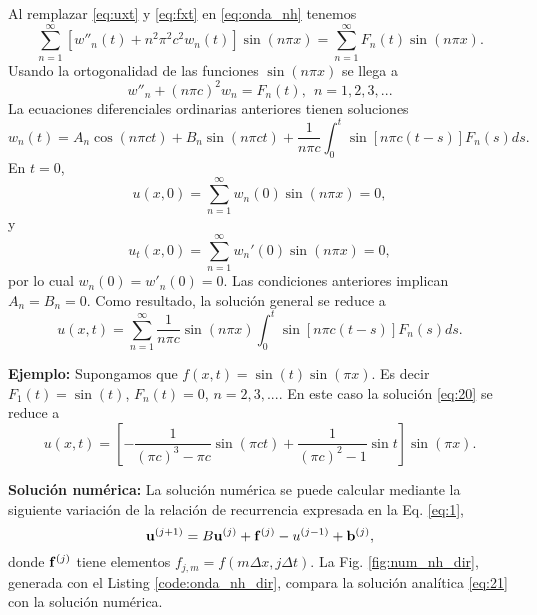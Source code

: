 \documentclass[11pt]{article}
\begin{document}
Al remplazar \eqref{eq:uxt} y \eqref{eq:fxt} en \eqref{eq:onda_nh} tenemos
\begin{equation}
  \label{eq:14}
  \sum_{n=1}^\infty \left[w''_n(t) + n^2\pi^2c^2 w_n(t)\right]\sin(n\pi x) = \sum_{n=1}^\infty F_n(t)\sin(n\pi x).
\end{equation}
Usando la ortogonalidad de las funciones $\sin(n\pi x)$ se llega a
\begin{equation}
  \label{eq:15}
  w''_n + (n\pi c)^2 w_n = F_n(t),~~n=1,2,3,...
\end{equation}
La ecuaciones diferenciales ordinarias anteriores tienen soluciones 
\begin{equation}
  \label{eq:17}
  w_n(t) = A_n \cos(n\pi ct) + B_n \sin(n\pi ct) + \frac{1}{n\pi c}\int_0^t \sin[n\pi c(t-s)]F_n(s)ds.
\end{equation}
En $t=0$,
\begin{equation}
  \label{eq:18}
  u(x,0) = \sum_{n=1}^\infty w_n(0)\sin(n\pi x) = 0,
\end{equation}
y
\begin{equation}
  \label{eq:18}
  u_t(x,0) = \sum_{n=1}^\infty w_n'(0)\sin(n\pi x) = 0,
\end{equation}
por lo cual $w_n(0) = w'_n(0)=0$. Las condiciones anteriores implican $A_n = B_n = 0$. Como resultado, la soluci\'on general se reduce a
\begin{equation}
  \label{eq:20}
  u(x,t) = \sum_{n=1}^\infty \frac{1}{n\pi c} \sin(n\pi x) \int_0^t \sin[n\pi c(t-s)]F_n(s)ds.
\end{equation}

{\bf Ejemplo:} Supongamos que $f(x,t) = \sin(t)\sin(\pi x)$. Es decir $F_1(t) = \sin(t)$, $F_n(t) = 0$, $n=2,3,...$. En este caso la soluci\'on \eqref{eq:20} se reduce a 
\begin{equation}
  \label{eq:21}
  u(x,t) = \left[-\frac{1}{(\pi c)^3 - \pi c}\sin(\pi ct) +
    \frac{1}{(\pi c)^2 - 1}\sin t \right]
  \sin(\pi x).
\end{equation}

{\bf Soluci\'on num\'erica:} La soluci\'on num\'erica se puede calcular mediante la siguiente variaci\'on de la relaci\'on de recurrencia expresada en la Eq. \eqref{eq:1},
\begin{equation}
  \label{eq:22}
    {\bf u}^{(j+1)} = B{\bf u}^{(j)} + {\bf f}^{(j)}- u^{(j-1)} + {\bf b}^{(j)},
\end{equation}
donde ${\bf f}^{(j)}$ tiene elementos $f_{j,m} = f(m\Delta x, j\Delta t)$. La Fig. \ref{fig:num_nh_dir}, generada con el Listing \eqref{code:onda_nh_dir}, compara la soluci\'on anal\'itica \eqref{eq:21} con la soluci\'on num\'erica. 
\end{document}
